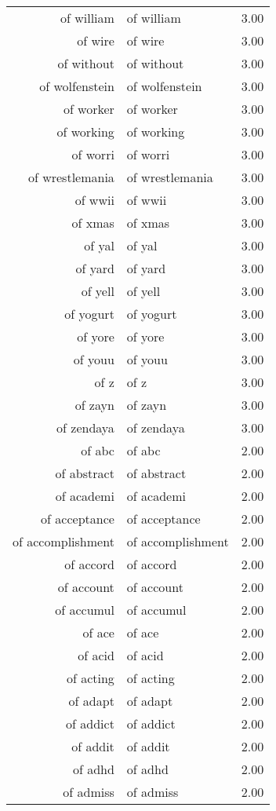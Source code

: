 \begin{table}[ht]
\begin{tabular}{rlr}
  of william & of william & 3.00 \\ 
  of wire & of wire & 3.00 \\ 
  of without & of without & 3.00 \\ 
  of wolfenstein & of wolfenstein & 3.00 \\ 
  of worker & of worker & 3.00 \\ 
  of working & of working & 3.00 \\ 
  of worri & of worri & 3.00 \\ 
  of wrestlemania & of wrestlemania & 3.00 \\ 
  of wwii & of wwii & 3.00 \\ 
  of xmas & of xmas & 3.00 \\ 
  of yal & of yal & 3.00 \\ 
  of yard & of yard & 3.00 \\ 
  of yell & of yell & 3.00 \\ 
  of yogurt & of yogurt & 3.00 \\ 
  of yore & of yore & 3.00 \\ 
  of youu & of youu & 3.00 \\ 
  of z & of z & 3.00 \\ 
  of zayn & of zayn & 3.00 \\ 
  of zendaya & of zendaya & 3.00 \\ 
  of abc & of abc & 2.00 \\ 
  of abstract & of abstract & 2.00 \\ 
  of academi & of academi & 2.00 \\ 
  of acceptance & of acceptance & 2.00 \\ 
  of accomplishment & of accomplishment & 2.00 \\ 
  of accord & of accord & 2.00 \\ 
  of account & of account & 2.00 \\ 
  of accumul & of accumul & 2.00 \\ 
  of ace & of ace & 2.00 \\ 
  of acid & of acid & 2.00 \\ 
  of acting & of acting & 2.00 \\ 
  of adapt & of adapt & 2.00 \\ 
  of addict & of addict & 2.00 \\ 
  of addit & of addit & 2.00 \\ 
  of adhd & of adhd & 2.00 \\ 
  of admiss & of admiss & 2.00 \\ 

\end{tabular}
\end{table}
